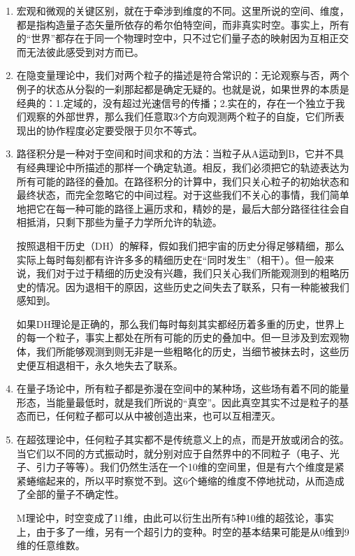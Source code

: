 \documentclass[UTF8]{ctexart}
\begin{document}
\begin{enumerate}
			\item 宏观和微观的关键区别，就在于牵涉到维度的不同。这里所说的空间、维度，都是指构造量子态矢量所依存的希尔伯特空间，而非真实时空。事实上，所有的“世界”都存在于同一个物理时空中，只不过它们量子态的映射因为互相正交而无法彼此感受到对方而已。
			
			\item 在隐变量理论中，我们对两个粒子的描述是符合常识的：无论观察与否，两个例子的状态从分裂的一刹那起都是确定无疑的。也就是说，如果世界的本质是经典的：1.定域的，没有超过光速信号的传播；2.实在的，存在一个独立于我们观察的外部世界，那么我们任意取3个方向观测两个粒子的自旋，它们所表现出的协作程度必定要受限于贝尔不等式。
			
			\item 路径积分是一种对于空间和时间求和的方法：当粒子从A运动到B，它并不具有经典理论中所描述的那样一个确定轨道。相反，我们必须把它的轨迹表达为所有可能的路径的叠加。在路径积分的计算中，我们只关心粒子的初始状态和最终状态，而完全忽略它的中间过程。对于这些我们不关心的事情，我们简单地把它在每一种可能的路径上遍历求和，精妙的是，最后大部分路径往往会自相抵消，只剩下那些为量子力学所允许的轨迹。
			
			按照退相干历史（DH）的解释，假如我们把宇宙的历史分得足够精细，那么实际上每时每刻都有许许多多的精细历史在“同时发生”（相干）。但一般来说，我们对于过于精细的历史没有兴趣，我们只关心我们所能观测到的粗略历史的情况。因为退相干的原因，这些历史之间失去了联系，只有一种能被我们感知到。
			
			如果DH理论是正确的，那么我们每时每刻其实都经历着多重的历史，世界上的每一个粒子，事实上都处在所有可能的历史的叠加中。但一旦涉及到宏观物体，我们所能够观测到则无非是一些粗略化的历史，当细节被抹去时，这些历史便互相退相干，永久地失去了联系。
			
			\item 在量子场论中，所有粒子都是弥漫在空间中的某种场，这些场有着不同的能量形态，当能量最低时，就是我们所说的“真空”。因此真空其实不过是粒子的基态而已，任何粒子都可以从中被创造出来，也可以互相湮灭。
			
			\item 在超弦理论中，任何粒子其实都不是传统意义上的点，而是开放或闭合的弦。当它们以不同的方式振动时，就分别对应于自然界中的不同粒子（电子、光子、引力子等等）。我们仍然生活在一个10维的空间里，但是有六个维度是紧紧蜷缩起来的，所以平时察觉不到。这6个蜷缩的维度不停地扰动，从而造成了全部的量子不确定性。
			
			M理论中，时空变成了11维，由此可以衍生出所有5种10维的超弦论，事实上，由于多了一维，另有一个超引力的变种。时空的基本结果可能是从0维到9维的任意维数。
			

\end{enumerate}
\end{document}
